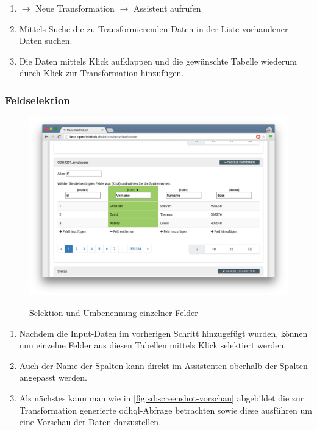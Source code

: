 \begin{enumerate}
\item {} $\to$ Neue Transformation $\to$ Assistent aufrufen
\item Mittels Suche die zu Transformierenden Daten in der Liste vorhandener Daten suchen.
\item Die Daten mittels Klick aufklappen und die gewünschte Tabelle wiederum durch Klick zur Transformation hinzufügen.
\end{enumerate}


\subsubsection{Feldselektion}

\begin{figure}[H]
	\centering
	\includegraphics[width=\linewidth]{fig/screenshot-felder-selektieren}
	\label{fig:sd:screenshot-felder-selektieren}
	\caption{Selektion und Umbenennung einzelner Felder}
\end{figure}

\begin{enumerate}
\item Nachdem die Input-Daten im vorherigen Schritt hinzugefügt wurden, können nun einzelne Felder aus diesen Tabellen mittels Klick selektiert werden.
\item Auch der Name der Spalten kann direkt im Assistenten oberhalb der Spalten angepasst werden.
\item Als nächstes kann man wie in \cref{fig:sd:screenshot-vorschau} abgebildet die zur Transformation generierte \acs{odhql}-Abfrage betrachten sowie diese ausführen um eine Vorschau der Daten darzustellen.
\end{enumerate}

